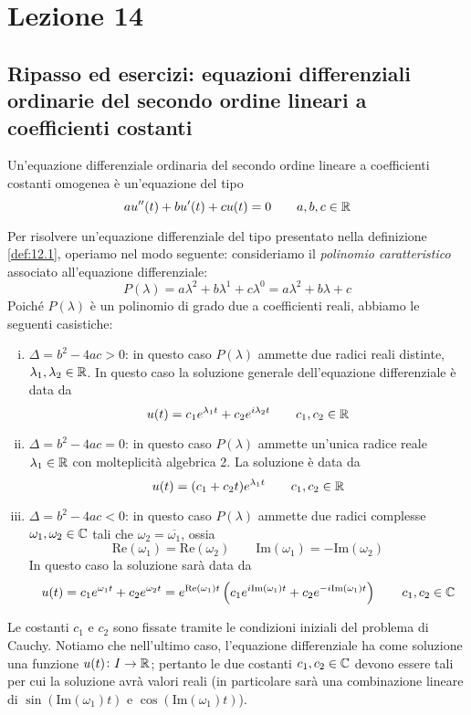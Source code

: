 \section{Lezione 14}
\subsection{Ripasso ed esercizi: equazioni differenziali ordinarie del secondo ordine lineari a coefficienti costanti}
\begin{definition}
    \label{def:12.1}
    Un'equazione differenziale ordinaria del secondo ordine lineare a coefficienti costanti omogenea è un'equazione del tipo
    \[
    au''(t)+bu'(t)+cu(t) = 0 \qquad a,b,c\in\amsbb{R}
    \]
\end{definition}
Per risolvere un'equazione differenziale del tipo presentato nella definizione \ref{def:12.1}, operiamo nel modo seguente: consideriamo il \emph{polinomio caratteristico} associato all'equazione differenziale:
\[
P(\lambda) = a \lambda^2 +b\lambda^1 + c \lambda^0 = a\lambda^2 +b\lambda + c
\]
Poiché $P(\lambda)$ è un polinomio di grado due a coefficienti reali, abbiamo le seguenti casistiche:
\begin{enumerate}[(i)]
    \item $\Delta = b^2-4ac>0$: in questo caso $P(\lambda)$ ammette due radici reali distinte, $\lambda_1, \lambda_2\in\amsbb{R}$. In questo caso la soluzione generale dell'equazione differenziale è data da
    \[
    u(t) = c_1 e^{\lambda_1 t} + c_2 e^{i\lambda_2 t} \qquad c_1, c_2\in\amsbb{R}
    \]
    \item $\Delta = b^2-4ac = 0$: in questo caso $P(\lambda)$ ammette un'unica radice reale $\lambda_1\in\amsbb{R}$ con molteplicità algebrica 2. La soluzione è data da
    \[
    u(t) = (c_1 +c_2 t)e^{\lambda_1 t} \qquad c_1, c_2\in\amsbb{R}
    \]
    \item $\Delta= b^2-4ac<0$: in questo caso $P(\lambda)$ ammette due radici complesse $\omega_1, \omega_2\in\amsbb{C}$ tali che $\omega_2 = \overline{\omega_1}$, ossia
    \[
    \text{Re}(\omega_1) = \text{Re}(\omega_2) \qquad \text{Im}(\omega_1) = -\text{Im}(\omega_2)
    \]
    In questo caso la soluzione sarà data da
    \[
    u(t) = c_1 e^{\omega_1 t} + c_2 e^{\omega_2 t} = e^{\text{Re}(\omega_1)t}\left(c_1 e^{i\text{Im}(\omega_1)t} + c_2 e^{-i \text{Im}(\omega_1)t}\right) \qquad c_1, c_2\in\amsbb{C}
    \]
\end{enumerate}
\begin{remark}
    Le costanti $c_1$ e $c_2$ sono fissate tramite le condizioni iniziali del problema di Cauchy. Notiamo che nell'ultimo caso, l'equazione differenziale ha come soluzione una funzione $u(t)\colon I \to \amsbb{R}$; pertanto le due costanti $c_1, c_2\in\amsbb{C}$ devono essere tali per cui la soluzione avrà valori reali (in particolare sarà una combinazione lineare di $\sin(\text{Im}(\omega_1)t)$ e $\cos(\text{Im}(\omega_1)t)$).
\end{remark}
